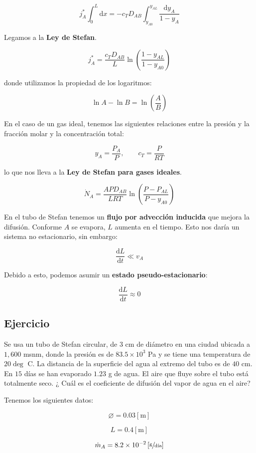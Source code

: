 \documentclass[11pt]{article}
\begin{document}
\[ j_A^* \int_0^L \mathrm d x = - c_T D_{AB}  \int_{y_{A0}}^{y_{AL}} \frac{ \mathrm d y_A }{ 1 - y_A } \]

Legamos a la \textbf{Ley de Stefan}.

\[ \boxed{ j_A^* = \frac{ c_T D_{AB} }{ L } \ln \left( \frac{ 1 - y_{AL} }{ 1 - y_{A0} } \right) } \]

donde utilizamos la propiedad de los logaritmos:

\[ \ln A - \ln B = \ln \left( \frac{A}{B} \right) \]

En el caso de un gas ideal, tenemos las siguientes relaciones entre la presión y la fracción molar y la concentración total:

\[ y_A = \frac{P_A}{P}, \qquad c_T = \frac{P}{RT} \]

lo que nos lleva a la \textbf{Ley de Stefan para gases ideales}.

\[ \boxed{ {\dot N}_A = \frac{ A P D_{AB} }{ L R T } \ln \left( \frac{ P - P_{AL} }{ P - y_{A0} } \right) } \]

En el tubo de Stefan tenemos un \textbf{flujo por advección inducida} que mejora la difusión. Conforme \( A \) se evapora, \( L \) aumenta en el tiempo. Esto nos daría un sistema no estacionario, sin embargo:

\[ \frac{ \mathrm d L }{ \mathrm d t } \ll v_A \]

Debido a esto, podemos asumir un \textbf{estado pseudo-estacionario}:

\[ \frac{ \mathrm d L }{ \mathrm d t } \approx 0 \]

\subsection{Ejercicio}

Se usa un tubo de Stefan circular, de \( 3 \) cm de diámetro en una ciudad ubicada a \( 1,600 \) msnm, donde la presión es de \( 83.5 \times 10^3 \) Pa y se tiene una temperatura de \( 20\deg\) C. La distancia de la superficie del agua al extremo del tubo es de \( 40 \) cm. En \( 15 \) días se han evaporado \( 1.23 \) g de agua. El aire que fluye sobre el tubo está totalmente seco. ¿ Cuál es el coeficiente de difusión del vapor de agua en el aire?

Tenemos los siguientes datos:

\[ \diameter = 0.03 \left[ \text{m} \right] \]

\[ L = 0.4 \left[ \text{m} \right] \]

\[ {\dot m}_A = 8.2 \times 10^{-2} \left[ \sfrac{\text{g}}{\text{día}} \right] \]
\end{document}
